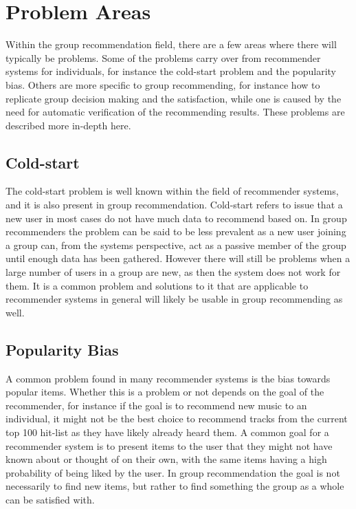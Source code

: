 \section{Problem Areas} \label{sec:problemareas}

Within the group recommendation field, there are a few areas where there will typically be problems. Some of the problems carry over from recommender systems for individuals, for instance the cold-start problem and the popularity bias. Others are more specific to group recommending, for instance how to replicate group decision making and the satisfaction, while one is caused by the need for automatic verification of the recommending results. These problems are described more in-depth here. 

\subsection{Cold-start}
The cold-start problem is well known within the field of recommender systems, and it is also present in group recommendation. Cold-start refers to issue that a new user in most cases do not have much data to recommend based on. In group recommenders the problem can be said to be less prevalent as a new user joining a group can, from the systems perspective, act as a passive member of the group until enough data has been gathered. However there will still be problems when a large number of users in a group are new, as then the system does not work for them. It is a common problem and solutions to it that are applicable to recommender systems in general will likely be usable in group recommending as well.

\subsection{Popularity Bias}
A common problem found in many recommender systems is the bias towards popular items. Whether this is a problem or not depends on the goal of the recommender, for instance if the goal is to recommend new music to an individual, it might not be the best choice to recommend tracks from the current top 100 hit-list as they have likely already heard them. A common goal for a recommender system is to present items to the user that they might not have known about or thought of on their own, with the same items having a high probability of being liked by the user. In group recommendation the goal is not necessarily to find new items, but rather to find something the group as a whole can be satisfied with.


